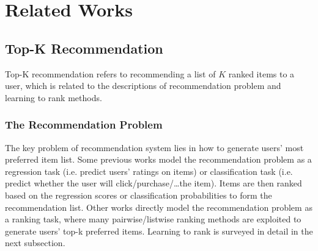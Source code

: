 \section{Related Works}
\subsection{Top-K Recommendation}
\label{sec:top_k_related}
Top-K recommendation refers to recommending a list of $K$ ranked items to a user, which is related to the descriptions of recommendation problem and learning to rank methods.
\subsubsection{The Recommendation Problem}
The key problem of recommendation system lies in how to generate users' most preferred item list.
Some previous works \cite{koren2009matrix} model the recommendation problem as a regression task (i.e. predict users' ratings on items) or classification task (i.e. predict whether the user will click/purchase/\ldots the item).
Items are then ranked based on the regression scores or classification probabilities to form the recommendation list.
Other works \cite{rendle2009bpr,wang2017irgan,he2017neural,he2018adversarial} directly model the recommendation problem as a ranking task, where many pairwise/listwise ranking methods are exploited to generate users' top-k preferred items.
Learning to rank is surveyed in detail in the next subsection.

